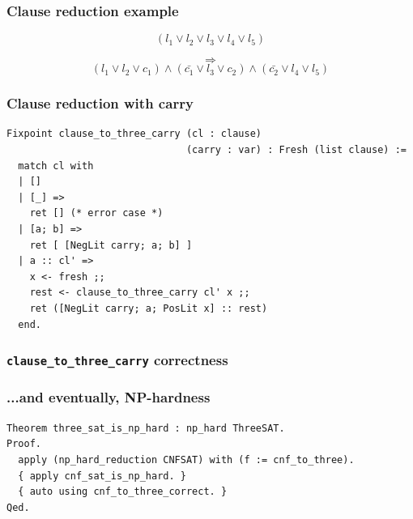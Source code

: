 \documentclass{beamer}
\begin{document}
\begin{frame}
  \frametitle{Clause reduction example}

  $$ (l_1 \lor l_2 \lor l_3 \lor l_4 \lor l_5) $$
  \par
  $$\Rightarrow$$
  \pause
  $$ (l_1 \lor l_2 \lor c_1) \land (\bar{c_1} \lor l_3 \lor c_2) \land (\bar{c_2} \lor l_4 \lor l_5) $$

\end{frame}

\begin{frame}[fragile]
  \frametitle{Clause reduction with carry}

  \begin{verbatim}
Fixpoint clause_to_three_carry (cl : clause)
                               (carry : var) : Fresh (list clause) :=
  match cl with
  | []
  | [_] =>
    ret [] (* error case *)
  | [a; b] =>
    ret [ [NegLit carry; a; b] ]
  | a :: cl' =>
    x <- fresh ;;
    rest <- clause_to_three_carry cl' x ;;
    ret ([NegLit carry; a; PosLit x] :: rest)
  end.
  \end{verbatim}

\end{frame}

\begin{frame}[fragile]
  \frametitle{\texttt{clause\_to\_three\_carry} correctness}

\end{frame}

\begin{frame}[fragile]
  \frametitle{...and eventually, NP-hardness}

  \begin{verbatim}
Theorem three_sat_is_np_hard : np_hard ThreeSAT.
Proof.
  apply (np_hard_reduction CNFSAT) with (f := cnf_to_three).
  { apply cnf_sat_is_np_hard. }
  { auto using cnf_to_three_correct. }
Qed.
  \end{verbatim}
\end{frame}
\end{document}
